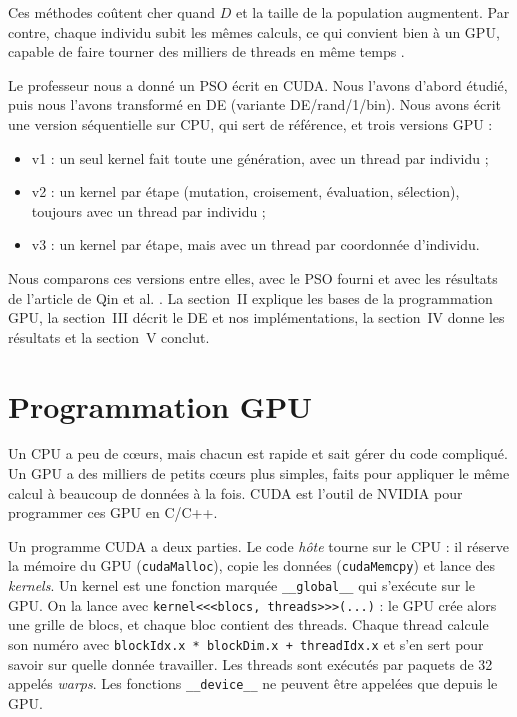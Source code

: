 \documentclass[conference]{IEEEtran}
\begin{document}
Ces m\'ethodes co\^utent cher quand $D$ et la taille de la population augmentent. Par contre, chaque individu subit les m\^emes calculs, ce qui convient bien \`a un GPU, capable de faire tourner des milliers de threads en m\^eme temps \cite{qin}.

Le professeur nous a donn\'e un PSO \'ecrit en CUDA. Nous l'avons d'abord \'etudi\'e, puis nous l'avons transform\'e en DE (variante DE/rand/1/bin). Nous avons \'ecrit une version s\'equentielle sur CPU, qui sert de r\'ef\'erence, et trois versions GPU :
\begin{itemize}
\item v1 : un seul kernel fait toute une g\'en\'eration, avec un thread par individu ;
\item v2 : un kernel par \'etape (mutation, croisement, \'evaluation, s\'election), toujours avec un thread par individu ;
\item v3 : un kernel par \'etape, mais avec un thread par coordonn\'ee d'individu.
\end{itemize}
Nous comparons ces versions entre elles, avec le PSO fourni et avec les r\'esultats de l'article de Qin et al. \cite{qin}. La section~II explique les bases de la programmation GPU, la section~III d\'ecrit le DE et nos impl\'ementations, la section~IV donne les r\'esultats et la section~V conclut.

\section{Programmation GPU}
Un CPU a peu de c\oe urs, mais chacun est rapide et sait g\'erer du code compliqu\'e. Un GPU a des milliers de petits c\oe urs plus simples, faits pour appliquer le m\^eme calcul \`a beaucoup de donn\'ees \`a la fois. CUDA est l'outil de NVIDIA pour programmer ces GPU en C/C++.

Un programme CUDA a deux parties. Le code \emph{h\^ote} tourne sur le CPU : il r\'eserve la m\'emoire du GPU (\texttt{cudaMalloc}), copie les donn\'ees (\texttt{cudaMemcpy}) et lance des \emph{kernels}. Un kernel est une fonction marqu\'ee \texttt{\_\_global\_\_} qui s'ex\'ecute sur le GPU. On la lance avec \texttt{kernel<<<blocs, threads>>>(...)} : le GPU cr\'ee alors une grille de blocs, et chaque bloc contient des threads. Chaque thread calcule son num\'ero avec \texttt{blockIdx.x * blockDim.x + threadIdx.x} et s'en sert pour savoir sur quelle donn\'ee travailler. Les threads sont ex\'ecut\'es par paquets de 32 appel\'es \emph{warps}. Les fonctions \texttt{\_\_device\_\_} ne peuvent \^etre appel\'ees que depuis le GPU.
\end{document}
